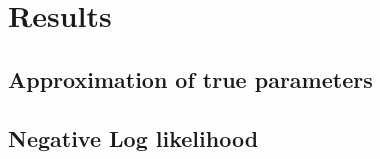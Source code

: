 \section{Results}

\subsection{Approximation of true parameters}


\subsection{Negative Log likelihood}



